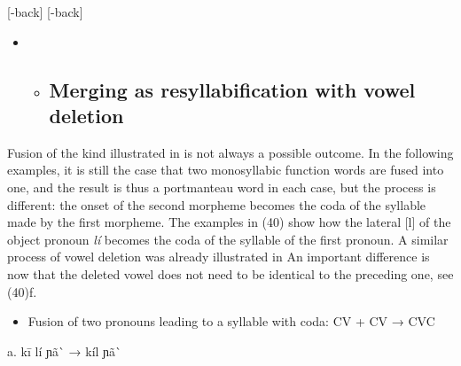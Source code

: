 \begin{styleindexi}
          [-high]        [labial]               [+high]              
\end{styleindexi}

\begin{styleindexi}
          [-back]                                [-back]
\end{styleindexi}

\begin{styleindexi}
          
\end{styleindexi}

\begin{styleindexi}
                            [ó]
\end{styleindexi}

\begin{itemize}
\item \begin{itemize}
\item \subsection{ Merging as resyllabification with vowel deletion} \end{itemize}
\end{itemize}

Fusion of the kind illustrated in  is not always a possible outcome. In the following examples, it is still the case that two monosyllabic function words are fused into one, and the result is thus a portmanteau word in each case, but the process is different: the onset of the second morpheme becomes the coda of the syllable made by the first morpheme. The examples in (40) show how the lateral [l] of the object pronoun \textit{lí} becomes the coda of the syllable of the first pronoun. A similar process of vowel deletion was already illustrated in  An important difference is now that the deleted vowel does not need to be identical to the preceding one, see (40)f.

\begin{itemize}
\item \begin{styleindexi}
   \label{bkm:Ref476434019}Fusion of two pronouns leading to a syllable with coda:   CV + CV → CVC   
\end{styleindexi}\end{itemize}
\begin{styleindexi}
      a.    kī              lí                  ɲã\`{}                →        kíl ɲã\`{} 
\end{styleindexi}

